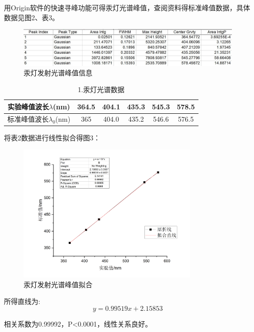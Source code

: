 \documentclass[12pt,a4paper,UTF8]{ctexart}
\begin{document}
用Origin软件的快速寻峰功能可得汞灯光谱峰值，查阅资料得标准峰值数据，具体数据见图2、表3。

\begin{figure}[htbp]
	\centering
	\includegraphics[width=\textwidth]{img//Hgpeak.jpg}
	\caption{汞灯发射光谱峰值信息}
	\label{fig:2}
\end{figure}


\begin{table}[htbp]
	\caption{1.汞灯光谱数据}
	\centering
    \begin{tabular}{cccccc}
	\toprule
    实验峰值波长$\lambda$(nm)&364.5&404.1&435.3&545.3&578.5\\
	\midrule
	标准峰值波长$\lambda_0$(nm)&365&404.0&435.2&546.6&576.5\\
	\bottomrule
	\end{tabular}%
	\label{tab:1}%
\end{table}%

将表2数据进行线性拟合得图3：

\begin{figure}[htbp]
	\centering
	\includegraphics[width=0.8\textwidth]{img//LeanearReg.png}
	\caption{汞灯发射光谱峰值拟合}
	\label{fig:3}
\end{figure}



所得直线为:
\begin{equation*}
	y=0.99519x+2.15853
\end{equation*}

相关系数为0.99992，P<0.0001，线性关系良好。
\end{document}
